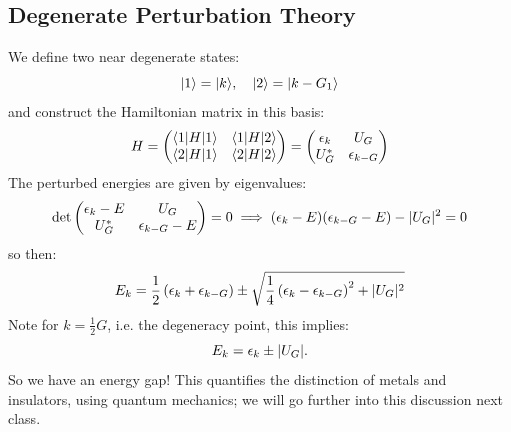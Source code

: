 \subsection{Degenerate Perturbation Theory}
We define two near degenerate states:
\begin{equation}
    \lvert 1 \rangle = \lvert k \rangle, \quad \lvert 2 \rangle = \lvert k - G_1 \rangle
\end{equation}
and construct the Hamiltonian matrix in this basis:
\begin{equation}
    H = \begin{pmatrix}\langle 1 \rvert H\lvert 1 \rangle & \langle 1 \rvert H\lvert 2 \rangle \\ \langle 2 \rvert H\lvert 1 \rangle & \langle 2 \rvert H\lvert 2 \rangle\end{pmatrix} = \begin{pmatrix}\epsilon_k & U_G \\ U_G^* & \epsilon_{k-G}\end{pmatrix}
\end{equation}
The perturbed energies are given by eigenvalues:
\begin{equation}
    \det\begin{pmatrix}\epsilon_k - E & U_G \\ U_G^* & \epsilon_{k-G} - E\end{pmatrix} = 0 \implies (\epsilon_k - E)(\epsilon_{k-G} - E) - \lvert U_G \rvert^2 = 0
\end{equation}
so then:
\begin{equation}
    E_k = \frac{1}{2}\left(\epsilon_k + \epsilon_{k-G}\right) \pm \sqrt{\frac{1}{4}\left(\epsilon_k - \epsilon_{k-G}\right)^2 + \lvert U_G \rvert^2}
\end{equation}
Note for $k = \frac{1}{2}G$, i.e. the degeneracy point, this implies:
\begin{equation}
    E_k = \epsilon_k \pm \lvert U_G \rvert.
\end{equation}
So we have an energy gap! This quantifies the distinction of metals and insulators, using quantum mechanics; we will go further into this discussion next class.

